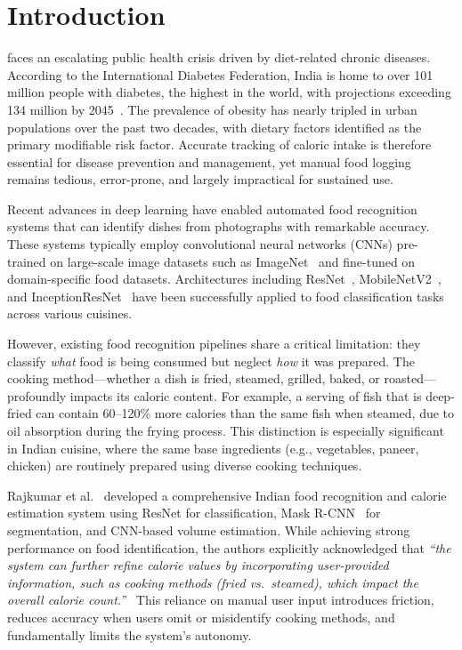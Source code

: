 \documentclass[journal]{IEEEtran}
\begin{document}
\section{Introduction}

 faces an escalating public health crisis driven by diet-related chronic diseases. According to the International Diabetes Federation, India is home to over 101 million people with diabetes, the highest in the world, with projections exceeding 134 million by 2045~\cite{rajkumar2024deep}. The prevalence of obesity has nearly tripled in urban populations over the past two decades, with dietary factors identified as the primary modifiable risk factor. Accurate tracking of caloric intake is therefore essential for disease prevention and management, yet manual food logging remains tedious, error-prone, and largely impractical for sustained use.

Recent advances in deep learning have enabled automated food recognition systems that can identify dishes from photographs with remarkable accuracy. These systems typically employ convolutional neural networks (CNNs) pre-trained on large-scale image datasets such as ImageNet~\cite{deng2009imagenet} and fine-tuned on domain-specific food datasets. Architectures including ResNet~\cite{he2016deep}, MobileNetV2~\cite{sandler2018mobilenetv2}, and InceptionResNet~\cite{szegedy2017inception} have been successfully applied to food classification tasks across various cuisines.

However, existing food recognition pipelines share a critical limitation: they classify \textit{what} food is being consumed but neglect \textit{how} it was prepared. The cooking method---whether a dish is fried, steamed, grilled, baked, or roasted---profoundly impacts its caloric content. For example, a serving of fish that is deep-fried can contain 60--120\% more calories than the same fish when steamed, due to oil absorption during the frying process. This distinction is especially significant in Indian cuisine, where the same base ingredients (e.g., vegetables, paneer, chicken) are routinely prepared using diverse cooking techniques.

Rajkumar et al.~\cite{rajkumar2024deep} developed a comprehensive Indian food recognition and calorie estimation system using ResNet for classification, Mask R-CNN~\cite{lin2017mask} for segmentation, and CNN-based volume estimation. While achieving strong performance on food identification, the authors explicitly acknowledged that \textit{``the system can further refine calorie values by incorporating user-provided information, such as cooking methods (fried vs.\ steamed), which impact the overall calorie count.''}~\cite{rajkumar2024deep} This reliance on manual user input introduces friction, reduces accuracy when users omit or misidentify cooking methods, and fundamentally limits the system's autonomy.
\end{document}
